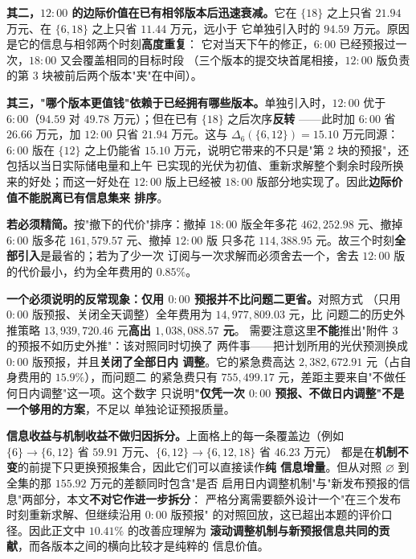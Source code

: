 \textbf{其二，$12{:}00$ 的边际价值在已有相邻版本后迅速衰减。}它在
$\{18\}$ 之上只省 $21.94$ 万元、在 $\{6,18\}$ 之上只省 $11.44$ 万元，远小于
它单独引入时的 $94.59$ 万元。原因是它的信息与相邻两个时刻\textbf{高度重复}：
它对当天下午的修正，$6{:}00$ 已经预报过一次，$18{:}00$ 又会覆盖相同的目标时段
（三个版本的提交块首尾相接，$12{:}00$ 版负责的第 3 块被前后两个版本"夹"在中间）。

\textbf{其三，"哪个版本更值钱"依赖于已经拥有哪些版本。}单独引入时，$12{:}00$
优于 $6{:}00$（$94.59$ 对 $49.78$ 万元）；但在已有 $\{18\}$ 之后次序\textbf{反转}
——此时加 $6{:}00$ 省 $26.66$ 万元，加 $12{:}00$ 只省 $21.94$ 万元。这与
$\Delta_6(\{6,12\})=15.10$ 万元同源：$6{:}00$ 版在 $\{12\}$ 之上仍能省
$15.10$ 万元，说明它带来的不只是"第 2 块的预报"，还包括以当日实际储电量和上午
已实现的光伏为初值、重新求解整个剩余时段所换来的好处；而这一好处在 $12{:}00$
版上已经被 $18{:}00$ 版部分地实现了。因此\textbf{边际价值不能脱离已有信息集来
排序}。

\textbf{若必须精简。}按"撤下的代价"排序：撤掉 $18{:}00$ 版全年多花
$462{,}252.98$ 元、撤掉 $6{:}00$ 版多花 $161{,}579.57$ 元、撤掉 $12{:}00$ 版
只多花 $114{,}388.95$ 元。故三个时刻\textbf{全部引入}是最省的；若为了少一次
订阅与一次求解而必须舍去一个，舍去 $12{:}00$ 版的代价最小，约为全年费用的
$0.85\%$。

\textbf{一个必须说明的反常现象：仅用 $0{:}00$ 预报并不比问题二更省。}对照方式
（只用 $0{:}00$ 版预报、关闭全天调整）全年费用为 $14{,}977{,}809.03$ 元，比
问题二的历史外推策略 $13{,}939{,}720.46$ 元\textbf{高出 $1{,}038{,}088.57$ 元}。
需要注意这里\textbf{不能}推出"附件 3 的预报不如历史外推"：该对照同时切换了
两件事——把计划所用的光伏预测换成 $0{:}00$ 版预报，并且\textbf{关闭了全部日内
调整}。它的紧急费高达 $2{,}382{,}672.91$ 元（占自身费用的 $15.9\%$），而问题二
的紧急费只有 $755{,}499.17$ 元，差距主要来自"不做任何日内调整"这一项。这个数字
只说明\textbf{"仅凭一次 $0{:}00$ 预报、不做日内调整"不是一个够用的方案}，不足以
单独论证预报质量。

\textbf{信息收益与机制收益不做归因拆分。}上面格上的每一条覆盖边（例如
$\{6\}\to\{6,12\}$ 省 $59.91$ 万元、$\{6,12\}\to\{6,12,18\}$ 省 $46.23$ 万元）
都是在\textbf{机制不变}的前提下只更换预报集合，因此它们可以直接读作\textbf{纯
信息增量}。但从对照 $\varnothing$ 到全集的那 $155.92$ 万元的差额同时包含"是否
启用日内调整机制"与"新发布预报的信息"两部分，本文\textbf{不对它作进一步拆分}：
严格分离需要额外设计一个"在三个发布时刻重新求解、但继续沿用 $0{:}00$ 版预报"
的对照回放，这已超出本题的评价口径。因此正文中 $10.41\%$ 的改善应理解为
\textbf{滚动调整机制与新预报信息共同的贡献}，而各版本之间的横向比较才是纯粹的
信息价值。


